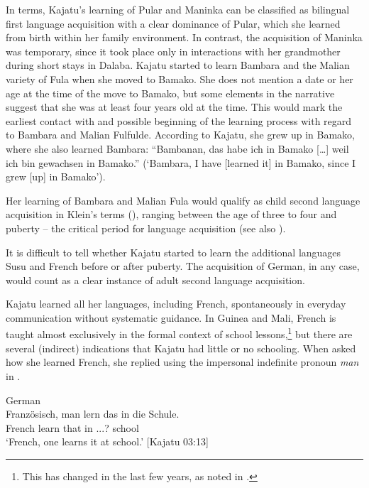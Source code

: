 \documentclass[output=paper]{langscibook}
\begin{document}
In  terms, Kajatu’s learning of Pular and Maninka can be classified as bilingual first language acquisition \citep[15]{klein_second_1986} with a clear dominance of Pular, which she learned from birth within her family environment. In contrast, the acquisition of Maninka was temporary, since it took place only in interactions with her grandmother during short stays in Dalaba. Kajatu started to learn Bambara and the Malian variety of Fula when she moved to Bamako. She does not mention a date or her age at the time of the move to Bamako, but some elements in the narrative suggest that she was at least four years old at the time. This would mark the earliest contact with and possible beginning of the learning process with regard to Bambara and Malian Fulfulde. According to Kajatu, she grew up in Bamako, where she also learned Bambara: “Bambanan, das habe ich in Bamako […] weil ich bin gewachsen in Bamako.” (‘Bambara, I have [learned it] in Bamako, since I grew [up] in Bamako’). 

Her learning of Bambara and Malian Fula would qualify as child second language acquisition in Klein's terms (\citeyear[15]{klein_second_1986}), ranging between the age of three to four and puberty – the critical period for language acquisition (see also \citealt[72ff]{matras_language_2020}). 

It is difficult to tell whether Kajatu started to learn the additional languages Susu and French before or after puberty. The acquisition of German, in any case, would count as a clear instance of adult second language acquisition. 

Kajatu learned all her languages, including French, spontaneously in everyday communication without systematic guidance. In Guinea and Mali, French is taught almost exclusively in the formal context of school lessons,\footnote{This has changed in the last few years, as noted in \citet{diallo_quelques_2021}.} but there are several (indirect) indications that Kajatu had little or no schooling. When asked how she learned French, she replied using the impersonal indefinite pronoun \textit{man} in .
\newpage

\begin{exe}
    \ex\label{fanego:ex:1} German \\
    \gll Französisch, man lern das in die Schule. \\
    French \INDF{} learn that in \Def.\SG.\F.\ACC{}? school \\
    \glt ‘French, one learns it at school.’ [Kajatu 03:13] %
\end{exe}
\end{document}
